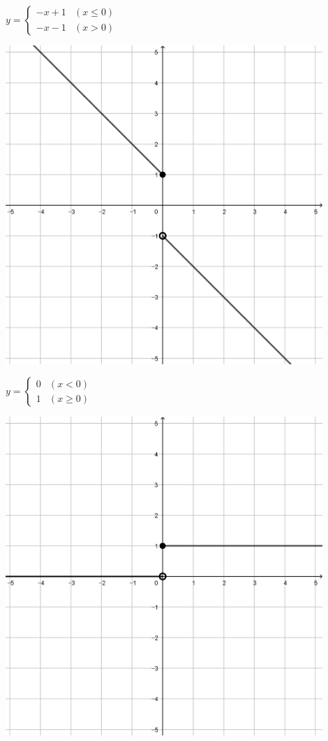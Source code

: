 \documentclass[a4paper]{oblivoir}
\begin{document}
\begin{minipage}{0.45\textwidth}\centering
\(y=\begin{cases}-x+1&(x\le0)\\-x-1&(x>0)\end{cases}\)
\par\bigskip\includegraphics[width=0.9\textwidth]{img/13-3}
\end{minipage}
\begin{minipage}{0.45\textwidth}\centering
\(y=\begin{cases}0&(x<0)\\1&(x\ge0)\end{cases}\)
\par\bigskip\includegraphics[width=0.9\textwidth]{img/13-4}
\end{minipage}\bigskip\bigskip\par
\end{document}
